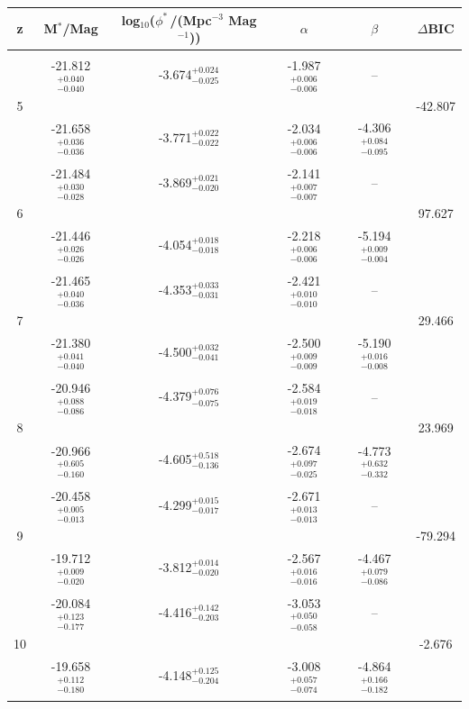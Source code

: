 \begin{table}
	\centering
	\begin{tabular}[t]{cccccc}
		\hline
		z &  M$^{*}$/Mag &  log$_{10}$($\phi^{*}$\,/(Mpc$^{-3}$ Mag$^{-1}$)) &  $\alpha$ & $\beta$ & $\Delta$BIC\\
		\hline\\
		& -21.812$^{+0.040}_{-0.040}$ & -3.674$^{+0.024}_{-0.025}$ &  -1.987$^{+0.006}_{-0.006}$ & --\\5&&&&& -42.807\\
		& -21.658$^{+0.036}_{-0.036}$ & -3.771$^{+0.022}_{-0.022}$ & -2.034$^{+0.006}_{-0.006}$ & -4.306$^{+0.084}_{-0.095}$\\\\
		& -21.484$^{+0.030}_{-0.028}$ &  -3.869$^{+0.021}_{-0.020}$ &  -2.141$^{+0.007}_{-0.007}$ & --\\6&&&&&97.627\\
		& -21.446$^{+0.026}_{-0.026}$ & -4.054$^{+0.018}_{-0.018}$ & -2.218$^{+0.006}_{-0.006}$ & -5.194$^{+0.009}_{-0.004}$\\\\
		& -21.465$^{+0.040}_{-0.036}$ &  -4.353$^{+0.033}_{-0.031}$ &  -2.421$^{+0.010}_{-0.010}$ & --\\7&&&&& 29.466\\
		& -21.380$^{+0.041}_{-0.040}$ & -4.500$^{+0.032}_{-0.041}$ & -2.500$^{+0.009}_{-0.009}$ & -5.190$^{+0.016}_{-0.008}$\\\\
		& -20.946$^{+0.088}_{-0.086}$ &  -4.379$^{+0.076}_{-0.075}$ &  -2.584$^{+0.019}_{-0.018}$ & --\\8&&&&& 23.969\\
		& -20.966$^{+0.605}_{-0.160}$ & -4.605$^{+0.518}_{-0.136}$ & -2.674$^{+0.097}_{-0.025}$ & -4.773$^{+0.632}_{-0.332}$\\\\
		& -20.458$^{+0.005}_{-0.013}$ &  -4.299$^{+0.015}_{-0.017}$ &  -2.671$^{+0.013}_{-0.013}$ & --\\9&&&&& -79.294\\
		& -19.712$^{+0.009}_{-0.020}$ & -3.812$^{+0.014}_{-0.020}$ & -2.567$^{+0.016}_{-0.016}$ & -4.467$^{+0.079}_{-0.086}$\\\\
		& -20.084$^{+0.123}_{-0.177}$ & -4.416$^{+0.142}_{-0.203}$ &  -3.053$^{+0.050}_{-0.058}$ & --\\10&&&&& -2.676\\
		& -19.658$^{+0.112}_{-0.180}$ & -4.148$^{+0.125}_{-0.204}$ & -3.008$^{+0.057}_{-0.074}$ & -4.864$^{+0.166}_{-0.182}$\\\\

\end{tabular}
\end{table}
